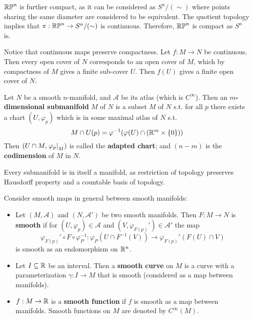 \documentclass{article}
\begin{document}
\begin{remark}
    $\mathbb{RP}^n$ is further compact, as it can be considered as $S^n / (\sim)$ where points sharing the same diameter are considered to be equivalent. The quotient topology implies that $\pi: \mathbb{RP}^n \to S^n / (\sim)$ is continuous. Therefore, $\mathbb{RP}^n$ is compact as $S^n$ is. 
    
    Notice that continuous maps preserve compactness. Let $f: M \to N$ be continuous. Then every open cover of $N$ corresponds to an open cover of $M$, which by compactness of $M$ gives a finite sub-cover $U$. Then $f(U)$ gives a finite open cover of $N$. 
\end{remark}

\begin{definition}[Submanifold]
    Let $N$ be a smooth $n$-manifold, and $\mathcal{A}$ be its atlas (which is $C^{\infty}$). Then an \textbf{$m$-dimensional submanifold} $M$ of $N$ is a subset $M$ of $N$ s.t. for all $p$ there exists a chart $(U, \varphi_p)$ which is in some maximal atlas of $N$ s.t.
    \[
        M \cap U(p) = \varphi^{-1}(\varphi(U) \cap (\mathbb{R}^m \times \{0\}))
    \] 
    Then $(U \cap M, \left.\varphi_p\right|_{M})$ is called the \textbf{adapted chart}; and $(n - m)$ is the \textbf{codimension} of $M$ in $N$.
\end{definition}

\begin{remark}
    Every submanifold is in itself a manifold, as restriction of topology preserves Hausdorff property and a countable basis of topology.
\end{remark}

\begin{definition}
    Consider smooth maps in general between smooth manifolds:
    \begin{itemize}
        \item Let $(M, \mathcal{A})$ and $(N, \mathcal{A}')$ be two smooth manifolds. Then $F: M \to N$ is \textbf{smooth} if for $(U, \varphi_p) \in \mathcal{A}$ and $(V, \varphi_{F(p)}') \in \mathcal{A}'$ the map
        \[
            \varphi_{F(p)}' \circ F \circ \varphi_P^{-1} : \varphi_P(U \cap F^{-1}(V)) \to \varphi_{F(p)}' (F(U) \cap V)
        \]
        is smooth as an endomorphism on $\mathbb{R}^n$.
        \item Let $I \subseteq \mathbb{R}$ be an interval. Then a \textbf{smooth curve} on $M$ is a curve with a parameterization $\gamma: I \to M$ that is smooth (considered as a map between manifolds). 
        \item $f: M \to \mathbb{R}$ is a \textbf{smooth function} if $f$ is smooth as a map between manifolds. Smooth functions on $M$ are denoted by $C^{\infty}(M)$.
    \end{itemize}
\end{definition}
\end{document}
